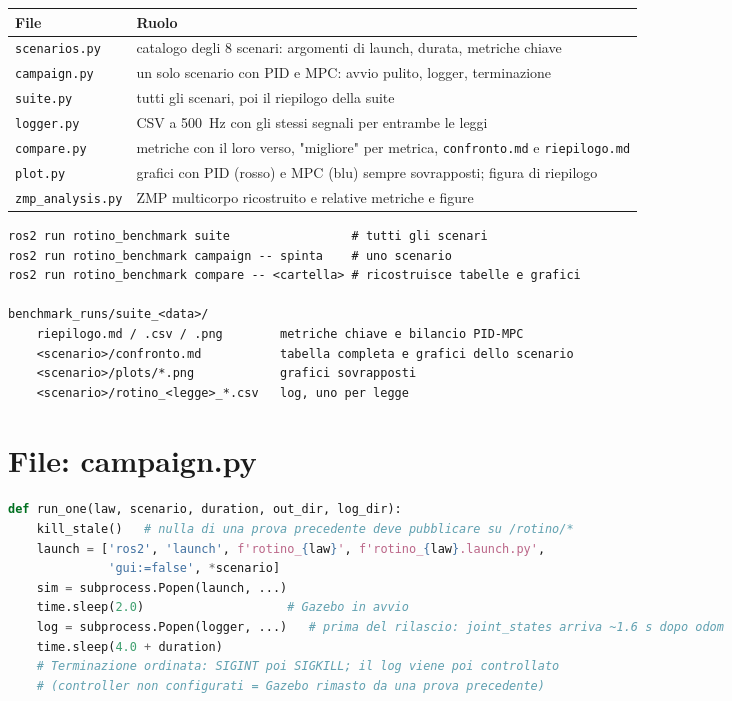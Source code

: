 \documentclass[11pt,a4paper]{report}
\begin{document}
\begin{center}
\begin{tabular}{lp{10cm}}
\toprule
\textbf{File} & \textbf{Ruolo} \\
\midrule
\texttt{scenarios.py} & catalogo degli 8 scenari: argomenti di launch, durata, metriche chiave \\
\texttt{campaign.py} & un solo scenario con PID e MPC: avvio pulito, logger, terminazione \\
\texttt{suite.py} & tutti gli scenari, poi il riepilogo della suite \\
\texttt{logger.py} & CSV a 500~Hz con gli stessi segnali per entrambe le leggi \\
\texttt{compare.py} & metriche con il loro verso, "migliore" per metrica, \texttt{confronto.md} e \texttt{riepilogo.md} \\
\texttt{plot.py} & grafici con PID (rosso) e MPC (blu) sempre sovrapposti; figura di riepilogo \\
\texttt{zmp\_analysis.py} & ZMP multicorpo ricostruito e relative metriche e figure \\
\bottomrule
\end{tabular}
\end{center}

\begin{verbatim}
ros2 run rotino_benchmark suite                 # tutti gli scenari
ros2 run rotino_benchmark campaign -- spinta    # uno scenario
ros2 run rotino_benchmark compare -- <cartella> # ricostruisce tabelle e grafici

benchmark_runs/suite_<data>/
    riepilogo.md / .csv / .png        metriche chiave e bilancio PID-MPC
    <scenario>/confronto.md           tabella completa e grafici dello scenario
    <scenario>/plots/*.png            grafici sovrapposti
    <scenario>/rotino_<legge>_*.csv   log, uno per legge
\end{verbatim}

\section{File: campaign.py}

\begin{lstlisting}[language=Python, caption=campaign.py: ciclo di vita di un run]
def run_one(law, scenario, duration, out_dir, log_dir):
    kill_stale()   # nulla di una prova precedente deve pubblicare su /rotino/*
    launch = ['ros2', 'launch', f'rotino_{law}', f'rotino_{law}.launch.py',
              'gui:=false', *scenario]
    sim = subprocess.Popen(launch, ...)
    time.sleep(2.0)                    # Gazebo in avvio
    log = subprocess.Popen(logger, ...)   # prima del rilascio: joint_states arriva ~1.6 s dopo odom
    time.sleep(4.0 + duration)
    # Terminazione ordinata: SIGINT poi SIGKILL; il log viene poi controllato
    # (controller non configurati = Gazebo rimasto da una prova precedente)
\end{lstlisting}
\end{document}
